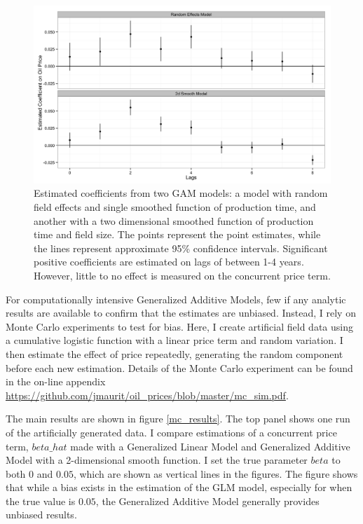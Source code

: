 \documentclass[11pt]{article}
\begin{document}
\begin{figure}
	\includegraphics[width=1\textwidth]{figures/price_coefficents.png}
	\caption{Estimated coefficients from two GAM models: a model with random field effects and single smoothed function of production time, and another with a two dimensional smoothed function of production time and field size.  The points represent the point estimates, while the lines represent approximate 95\% confidence intervals. Significant positive coefficients are estimated on lags of between 1-4 years.  However, little to no effect is measured on the concurrent price term.}
	\label{price_coefficients}
\end{figure}

For computationally intensive Generalized Additive Models, few if any analytic results are available to confirm that the estimates are unbiased.  Instead, I rely on Monte Carlo experiments to test for bias.  Here, I create artificial field data using a cumulative logistic function with a linear price term and random variation. I then estimate the effect of price repeatedly, generating the random component before each new estimation. Details of the Monte Carlo experiment can be found in the on-line appendix \url{https://github.com/jmaurit/oil_prices/blob/master/mc_sim.pdf}.  

The main results are shown in figure \ref{mc_results}.  The top panel shows one run of the artificially generated data. I compare estimations of a concurrent price term, $beta\_hat$ made with a Generalized Linear Model and Generalized Additive Model with a 2-dimensional smooth function.  I set the true parameter $beta$ to both $0$ and $0.05$, which are shown as vertical lines in the figures.  The figure shows that while a bias exists in the estimation of the GLM model, especially for when the true value is $0.05$, the Generalized Additive Model generally provides unbiased results. 
\end{document}
